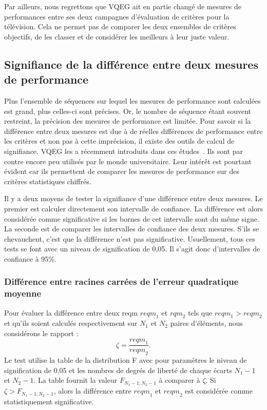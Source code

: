 Par ailleurs, nous regrettons que VQEG ait en partie changé de mesures de performances entre ses deux campagnes d'évaluation de critères pour la télévision. Cela ne permet pas de comparer les deux ensembles de critères objectifs, de les classer et de considérer les meilleurs à leur juste valeur.


\subsection{Signifiance de la différence entre deux mesures de performance}
Plus l'ensemble de séquences sur lequel les mesures de performance sont calculées est grand, plus celles-ci sont précises. Or, le nombre de séquence étant souvent restreint, la précision des mesures de performance est limitée. Pour savoir si la différence entre deux mesures est due à de réelles différences de performance entre les critères et non pas à cette imprécision, il existe des outils de calcul de signifiance. VQEG les a récemment introduits dans ces études~\cite{vqeg-MMtestplan,vqeg-hdtvtestplan}. Ils sont par contre encore peu utilisés par le monde universitaire. Leur intérêt est pourtant évident car ils permettent de comparer les mesures de performance sur des critères statistiques chiffrés.

Il y a deux moyens de tester la signifiance d'une différence entre deux mesures. Le premier est calculer directement son intervalle de confiance. La différence est alors considérée comme significative si les bornes de cet intervalle sont du même signe. La seconde est de comparer les intervalles de confiance des deux mesures. S'ils se chevauchent, c'est que la différence n'est pas significative. Usuellement, tous ces tests se font avec un niveau de signification de 0,05. Il s'agit donc d'intervalles de confiance à 95\%.


\subsubsection{Différence entre racines carrées de l'erreur quadratique moyenne}
Pour évaluer la différence entre deux reqm $\mathit{reqm}_1$ et $\mathit{rqm}_2$ tels que $\mathit{reqm}_1 > \mathit{reqm}_2$ et qu'ils soient calculés respectivement sur $N_1$ et $N_2$ paires d'éléments, nous considérons le rapport :
\begin{equation}
\zeta = \frac{\mathit{reqm}_1}{\mathit{reqm}_2}.
\end{equation}
%
Le test utilise la table de la distribution F avec pour paramètres le niveau de signification de 0,05 et les nombres de degrés de liberté de chaque écarts $N_1 - 1$ et $N_2 - 1$. La table fournit la valeur $F_{N_1-1;N_2-1}$ à comparer à $\zeta$. Si $\zeta > F_{N_1-1;N_2-1}$, alors la différence entre $\mathit{reqm}_1$ et $\mathit{reqm}_2$ est considérée comme statistiquement significative.

